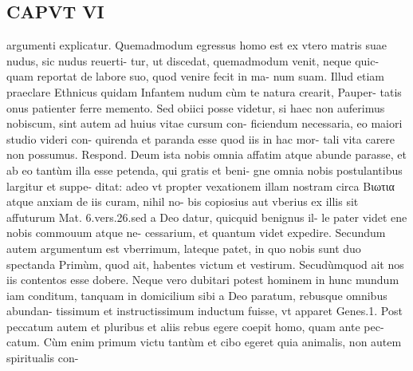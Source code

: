 \documentclass{article}
\begin{document}
\begin{pages}
\section*{CAPVT  VI }
\marginpar{[ p.444 ]}\pstart argumenti explicatur. Quemadmodum egressus homo est ex vtero matris suae nudus, sic nudus reuerti- tur, ut discedat, quemadmodum venit, neque quic- quam reportat de labore suo, quod venire fecit in ma- num suam. Illud etiam praeclare Ethnicus quidam Infantem nudum cùm te natura crearit, Pauper- tatis onus patienter ferre memento.  \pend\pstart Sed obiici posse videtur, si haec non auferimus nobiscum, sint autem ad huius vitae cursum con- ficiendum necessaria, eo maiori studio videri con- quirenda et paranda esse quod iis in hac mor- tali vita carere non possumus. Respond. Deum ista nobis omnia affatim atque abunde parasse, et ab eo tantùm illa esse petenda, qui gratis et beni- gne omnia nobis postulantibus largitur et suppe- ditat: adeo vt propter vexationem illam nostram circa Βιωτια atque anxiam de iis curam, nihil no- bis copiosius aut vberius ex illis sit affuturum Mat. 6.vers.26.sed a Deo datur, quicquid benignus il- le pater videt ene nobis commouum atque ne- cessarium, et quantum videt expedire.  \pend\pstart Secundum autem argumentum est vberrimum, lateque patet, in quo nobis sunt duo spectanda Primùm, quod ait, habentes victum et vestirum. Secudùmquod ait nos iis contentos esse dobere.  \pend\pstart Neque vero dubitari potest hominem in hunc mundum iam conditum, tanquam in domicilium sibi a Deo paratum, rebusque omnibus abundan- tissimum et instructissimum inductum fuisse, vt apparet Genes.1. Post peccatum autem et pluribus et aliis rebus egere coepit homo, quam ante pec- catum. Cùm enim primum victu tantùm et cibo egeret quia animalis, non autem spiritualis con-  \pend

\end{pages}
\end{document}
